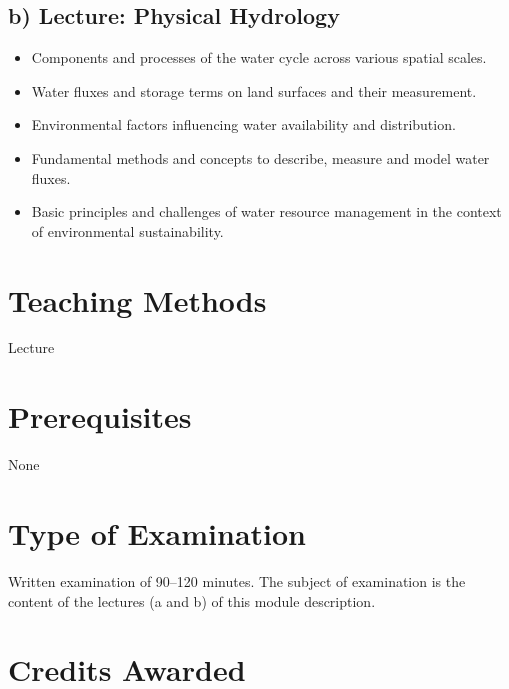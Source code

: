 \documentclass[
  letterpaper,
  10pt,
  openany]{book}
\providecommand{\tightlist}{%
  \setlength{\itemsep}{0pt}\setlength{\parskip}{0pt}}\usepackage{longtable,booktabs,array}
\begin{document}
\subsection*{b) Lecture: Physical
Hydrology}\label{b-lecture-physical-hydrology-1}

\begin{itemize}
\tightlist
\item
  Components and processes of the water cycle across various spatial
  scales.
\item
  Water fluxes and storage terms on land surfaces and their measurement.
\item
  Environmental factors influencing water availability and distribution.
\item
  Fundamental methods and concepts to describe, measure and model water
  fluxes.
\item
  Basic principles and challenges of water resource management in the
  context of environmental sustainability.
\end{itemize}

\section*{Teaching Methods}\label{teaching-methods}


Lecture

\section*{Prerequisites}\label{prerequisites}


None

\section*{Type of Examination}\label{type-of-examination}


Written examination of 90--120 minutes. The subject of examination is
the content of the lectures (a and b) of this module description.

\section*{Credits Awarded}\label{credits-awarded}
\end{document}

